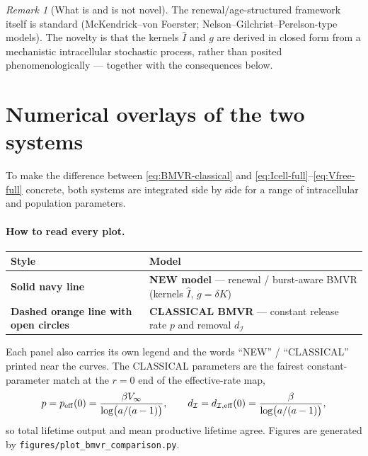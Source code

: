 \documentclass[11pt,a4paper]{article}
\newcommand{\Ihat}{\widehat{I}}
\newcommand{\Icell}{\mathcal{I}}
\theoremstyle{plain}
\theoremstyle{definition}
\theoremstyle{remark}
\newtheorem{remark}[result]{Remark}
\begin{document}
\begin{remark}[What is and is not novel]
The renewal/age-structured framework itself is standard (McKendrick--von
Foerster; Nelson--Gilchrist--Perelson-type models). The novelty is that the
kernels $\Ihat$ and $g$ are derived in closed form from a mechanistic
intracellular stochastic process, rather than posited phenomenologically ---
together with the consequences below.
\end{remark}

\section{Numerical overlays of the two systems}
\label{sec:overlays}

To make the difference between \eqref{eq:BMVR-classical} and
\eqref{eq:Icell-full}--\eqref{eq:Vfree-full} concrete, both systems are
integrated side by side for a range of intracellular and population
parameters.

\paragraph{How to read every plot.}
\begin{center}
\renewcommand{\arraystretch}{1.35}
\begin{tabular}{@{}ll@{}}
\toprule
Style & Model \\
\midrule
\textbf{Solid navy line} & \textbf{NEW model} --- renewal / burst-aware BMVR
  (kernels $\Ihat$, $g=\delta K$) \\
\textbf{Dashed orange line with open circles} & \textbf{CLASSICAL BMVR} ---
  constant release rate $p$ and removal $d_{\Icell}$ \\
\bottomrule
\end{tabular}
\end{center}
Each panel also carries its own legend and the words ``NEW'' / ``CLASSICAL''
printed near the curves. The CLASSICAL parameters are the fairest
constant-parameter match at the $r=0$ end of the effective-rate map,
\begin{equation}
p = p_{\rm eff}(0)=\frac{\beta V_\infty}{\log\bigl(a/(a-1)\bigr)},
\qquad
d_{\Icell}=d_{\Icell,{\rm eff}}(0)=\frac{\beta}{\log\bigl(a/(a-1)\bigr)},
\end{equation}
so total lifetime output and mean productive lifetime agree. Figures are
generated by \texttt{figures/plot\_bmvr\_comparison.py}.
\end{document}
